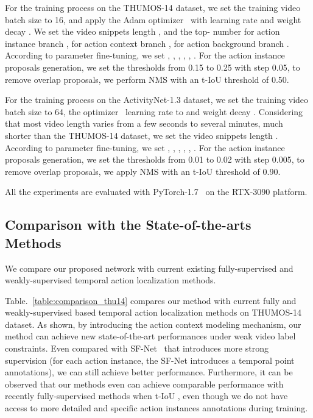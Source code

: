 \documentclass[journal,comsoc]{IEEEtran}
\begin{document}
\par For the training process on the THUMOS-14 dataset, we set the training video batch size to 16, and apply the Adam optimizer~\cite{adam} with learning rate  and weight decay . We set the video snippets length , and the top- number for action instance branch , for action context branch , for action background branch . According to parameter fine-tuning, we set , , , , ,  . For the action instance proposals generation, we set the thresholds from 0.15 to 0.25 with step 0.05, to remove overlap proposals, we perform NMS with an t-IoU threshold of 0.50.

\par For the training process on the ActivityNet-1.3 dataset, we set the training video batch size to 64, the optimizer~\cite{adam} learning rate to  and weight decay . Considering that most video length varies from a few seconds to several minutes, much shorter than the THUMOS-14 dataset, we set the video snippets length . According to parameter fine-tuning, we set , , , , ,  . For the action instance proposals generation, we set the thresholds from 0.01 to 0.02 with step 0.005, to remove overlap proposals, we apply NMS with an t-IoU threshold of 0.90. 
\par All the experiments are evaluated with PyTorch-1.7~\cite{pytorch} on the RTX-3090 platform.

\subsection{Comparison with the State-of-the-arts Methods}
\par We compare our proposed network with current existing fully-supervised and weakly-supervised temporal action localization methods. 

\par Table.~\ref{table:comparison_thu14} compares our method with current fully and weakly-supervised based temporal action localization methods on THUMOS-14 dataset. As shown, by introducing the action context modeling mechanism, our method can achieve new state-of-the-art performances under weak video label constraints.
Even compared with SF-Net~\cite{SFNet} that introduces more strong supervision (for each action instance, the SF-Net introduces a temporal point annotations), we can still achieve better performance. Furthermore, it can be observed that our methods even can achieve comparable performance with recently fully-supervised methods when t-IoU , even though we do not have access to more detailed and specific action instances annotations during training.
\end{document}
